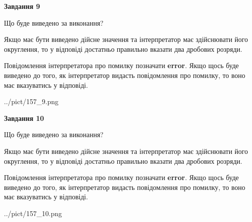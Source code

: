 \documentclass[12pt, ukrainian]{article}
\begin{document}
{\begin {Large}
{\begin {center}\textbf{Завдання 9}\end {center}}\par
Що буде виведено за виконання? \par

Якщо має бути виведено дійсне значення та інтерпретатор має здійснювати його округлення, 
то у відповіді достатньо правильно вказати два дробових розряди.

Повідомлення інтерпретатора про помилку позначати \textbf{error}.
Якщо щось буде виведено до того, як інтерпретатор видасть повідомлення про помилку, 
то воно має вказуватись у відповіді. \par

\begin{center}
	{../pict/157_9.png}
\end{center}
\newpage

{\begin {center}\textbf{Завдання 10}\end {center}}\par
Що буде виведено за виконання? \par

Якщо має бути виведено дійсне значення та інтерпретатор має здійснювати його округлення, 
то у відповіді достатньо правильно вказати два дробових розряди.

Повідомлення інтерпретатора про помилку позначати \textbf{error}.
Якщо щось буде виведено до того, як інтерпретатор видасть повідомлення про помилку, 
то воно має вказуватись у відповіді. \par

\begin{center}
	{../pict/157_10.png}
\end{center}
\newpage

\end {Large}}
\end{document}
